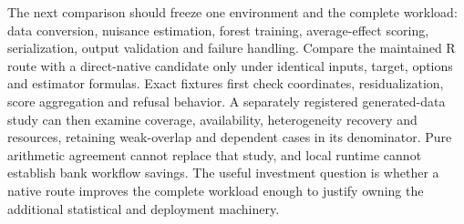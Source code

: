 The next comparison should freeze one environment and the complete
workload: data conversion, nuisance estimation, forest training,
average-effect scoring, serialization, output validation and failure
handling. Compare the maintained R route with a direct-native candidate
only under identical inputs, target, options and estimator formulas.
Exact fixtures first check coordinates, residualization, score
aggregation and refusal behavior. A separately registered generated-data
study can then examine coverage, availability, heterogeneity recovery
and resources, retaining weak-overlap and dependent cases in its
denominator. Pure arithmetic agreement cannot replace that study, and
local runtime cannot establish bank workflow savings. The useful
investment question is whether a native route improves the complete
workload enough to justify owning the additional statistical and
deployment machinery. \label{exec13:grf-adapter-end}
